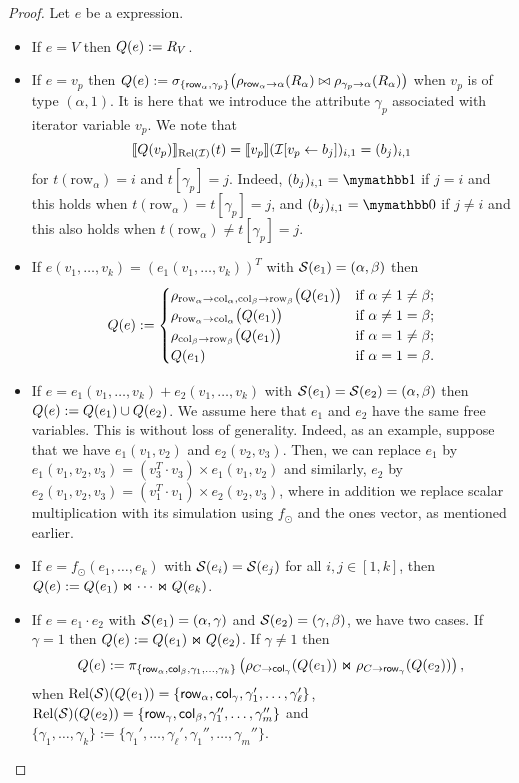 \begin{proof}
Let $e$ be a \langsum expression.
\begin{itemize}
  \item If $e=V$ then $Q (e):=R_V$.
  \item If $e=v_p$ then $Q (e):=\sigma_{\lbrace \mathsf{row}_\alpha,\gamma_p\rbrace}\bigl(\rho_{\mathsf{row}_\alpha\to \alpha}(R_\alpha)\bowtie \rho_{\gamma_p\to \alpha}(R_\alpha)\bigr)$ when  $v_p$ is of type $(\alpha,1)$. It is here that we introduce the attribute $\gamma_p$ associated with iterator variable $v_p$.
 We note that 
$$ \llbracket Q(v_p) \rrbracket_{\text{Rel}(\mathcal{I})}(t)=\llbracket v_p \rrbracket(\mathcal{I}[v_p\gets b_{j}])_{i,1}=(b_j)_{i,1}
$$
for $t(\mathrm{row}_\alpha)=i$ and $t[\gamma_p]=j$. Indeed, $(b_j)_{i,1}=\kone$ if $j=i$
and this holds when $t(\mathrm{row}_\alpha)=t[\gamma_p]=j$, and $(b_j)_{i,1}=\kzero$ if $j\neq i$
and this also holds when $t(\mathrm{row}_\alpha)\neq t[\gamma_p]=j$.

  \item If $e(v_1,\ldots,v_k)=(e_1(v_1,\ldots,v_k))^T$ with $\mathcal{S} (e_1)=(\alpha, \beta)$ then \[
Q(e) :=
\begin{cases}
\rho_{\mathrm{row}_\alpha \to \mathrm{col}_\alpha,\mathrm{col}_\beta \to \mathrm{row}_\beta}\bigl(Q(e_1)\bigr) & \text{if } \alpha \neq 1 \neq \beta; \cr
\rho_{\mathrm{row}_\alpha \to \mathrm{col}_\alpha}\bigl(Q(e_1)\bigr) & \text{if } \alpha \neq 1 = \beta; \cr
\rho_{\mathrm{col}_\beta \to \mathrm{row}_\beta}\bigl(Q(e_1)\bigr) & \text{if } \alpha = 1 \neq \beta; \cr
Q(e_1) & \text{if } \alpha = 1 = \beta.
\end{cases}
\]
\item If $e=e_1(v_1,\ldots,v_k)+e_2(v_1,\ldots,v_k)$ with $\mathcal{S} (e_1)=\mathcal{S} (e_2)=(\alpha, \beta)$ then $Q (e):=Q (e_1)\cup Q (e_2)$. We assume here that $e_1$ and $e_2$ have the same free variables. This is without loss of generality. Indeed, as an example, suppose that we have $e_1(v_1,v_2)$
and $e_2(v_2,v_3)$. Then, we can replace $e_1$ by  $e_1(v_1,v_2,v_3)=(v_3^T\cdot v_3)\times e_1(v_1,v_2)$
and similarly, $e_2$ by $e_2(v_1,v_2,v_3)=(v_1^T\cdot v_1)\times e_2(v_2,v_3)$, where in addition we replace scalar multiplication with its simulation using $f_{\odot}$ and the ones vector, as mentioned earlier. 

  \item If $e=f_\odot(e_1,\ldots, e_k)$ with $\mathcal{S}(e_i)=\mathcal{S}(e_j)$ for all $i,j\in[1,k]$, then $Q(e):=Q(e_1)\Join \cdots \Join Q(e_k)$.

  \item If $e=e_1\cdot e_2$ with $\mathcal{S} (e_1)=(\alpha, \gamma)$ and $\mathcal{S} (e_2)=(\gamma, \beta)$, we have two cases. If $\gamma = 1$ then $Q (e):=Q (e_1)\Join Q (e_2)$.
If $\gamma\neq 1$ then
$$
Q (e) := \pi_{\lbrace \mathsf{row}_{\alpha},\mathsf{col}_{\beta}, \gamma_1,\ldots,\gamma_k \rbrace}\left(\rho_{C\to \mathsf{col}_\gamma}(Q (e_1))\Join \rho_{C\to \mathsf{row}_\gamma}(Q (e_2)) \right),
$$
when $\text{Rel}(\mathcal{S})(Q(e_1))=\{\mathsf{row}_\alpha,\mathsf{col}_\gamma,\gamma_1',\ldots,\gamma_{\ell}'\}$,
$\text{Rel}(\mathcal{S})(Q(e_2))=\{\mathsf{row}_\gamma,\mathsf{col}_\beta,\gamma_1'',\ldots,\gamma_{m}''\}$ and $\{\gamma_1,\ldots,\gamma_k\}:=\{\gamma_1',\ldots,\gamma_\ell',\gamma_1'',\ldots,\gamma_m''\}$.


\end{itemize}
\end{proof}
